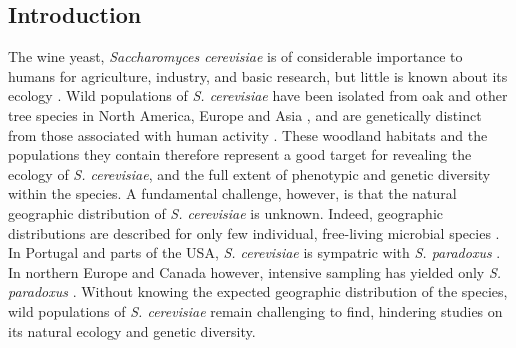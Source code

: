 \documentclass[12pt]{article}
\begin{document}
\begin{linenumbers}
\section*{Introduction}
\label{sec:Introduction}
\doublespacing

The wine yeast, \textit{Saccharomyces cerevisiae} is of considerable importance to humans for agriculture, industry, and basic research, but little is known about its ecology \citep{goddard_saccharomyces_2015,liti_fascinating_2015}. Wild populations of \textit{S. cerevisiae} have been isolated from oak and other tree species in North America, Europe and Asia \citep{sniegowski_saccharomyces_2002,sampaio_natural_2008,diezmann_saccharomyces_2009,wang_surprisingly_2012,hyma_mixing_2013}, and are genetically distinct from those associated with human activity \citep{fay_evidence_2005,cromie_genomic_2013,almeida_population_2015}. These woodland habitats and the populations they contain therefore represent a good target for revealing the ecology of \textit{S. cerevisiae}, and the full extent of phenotypic and genetic diversity within the species. A fundamental challenge, however, is that the natural geographic distribution of \textit{S. cerevisiae} is unknown. Indeed, geographic distributions are described for only few individual, free-living microbial species \citep{taylor_eukaryotic_2006,green_spatial_2006,martiny_microbial_2006}. In Portugal and parts of the USA, \textit{S. cerevisiae} is sympatric with \textit{S. paradoxus} \citep{sniegowski_saccharomyces_2002,sampaio_natural_2008,hyma_mixing_2013}. In northern Europe and Canada however, intensive sampling has yielded only \textit{S. paradoxus} \citep{johnson_population_2004,charron_exploring_2014,kowallik_interaction_2015,sylvester_temperature_2015}. Without knowing the expected geographic distribution of the species, wild populations of \textit{S. cerevisiae} remain challenging to find, hindering studies on its natural ecology and genetic diversity. 


\end{linenumbers}
\end{document}
